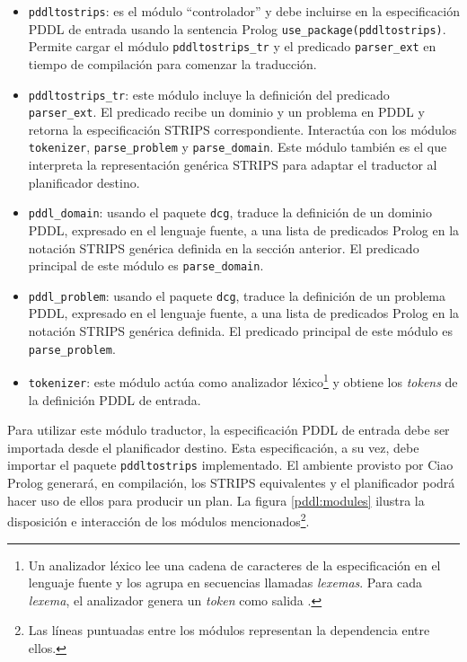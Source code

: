 	\begin{itemize}
	
	\item \texttt{pddltostrips}: es el m\'odulo
	``controlador'' y debe incluirse en la especificaci\'on PDDL de entrada
	usando la sentencia Prolog
        \texttt{use\_package(pddltostrips)}. Permite cargar el 
        m\'odulo \texttt{pddltostrips\_tr} y el
	predicado \texttt{parser\_ext} en tiempo de compilaci\'on
        para comenzar la traducci\'on.
	
	
	\item \texttt{pddltostrips\_tr}: este m\'odulo incluye la
        definici\'on del predicado \texttt{parser\_ext}. 
        El pre\-di\-ca\-do recibe un dominio y un problema en PDDL y retorna
        la especificaci\'on STRIPS correspondiente. Interact\'ua con
        los m\'odulos \texttt{tokenizer}, \texttt{parse\_problem}
        y \texttt{parse\_domain}. 
        Este m\'odulo tambi\'en es el que interpreta la
        representaci\'on gen\'erica STRIPS para adaptar el traductor
        al planificador destino.
	
	\item \texttt{pddl\_domain}: usando el paquete \texttt{dcg}, traduce la definici\'on de un
        dominio PDDL, expresado en el lenguaje fuente, a una lista de predicados 
	Prolog en la notaci\'on STRIPS gen\'erica definida en la
        secci\'on anterior. El predicado principal de este m\'odulo es \texttt{parse\_domain}.
	
	\item \texttt{pddl\_problem}: usando el paquete \texttt{dcg}, traduce la definici\'on de un
	problema PDDL, expresado en el lenguaje fuente, a una lista de predicados
	Prolog en la notaci\'on STRIPS gen\'erica definida. El
	predicado principal de este m\'odulo es \texttt{parse\_problem}.
	
	\item \texttt{tokenizer}: este m\'odulo act\'ua como
	analizador l\'exico\footnote{Un analizador l\'exico lee una
	cadena de caracteres de la especificaci\'on en el lenguaje
	fuente y los agrupa en secuencias
	llamadas \emph{lexemas}. Para cada \emph{lexema}, el
	analizador genera un \emph{token} como salida \cite{gbraun:Aho:2007}.} y 
        obtiene los \emph{tokens} de la definici\'on PDDL de entrada.
	
	\end{itemize}
	
	Para utilizar este m\'odulo traductor, la especificaci\'on
	PDDL de entrada debe ser importada desde el planificador destino. 
	Esta especificaci\'on, a su vez, debe importar el
	paquete \texttt{pddltostrips} implementado.
        El am\-bien\-te provisto por Ciao Prolog generar\'a, en compilaci\'on, los
	STRIPS equivalentes y el planificador
	podr\'a hacer uso de ellos para producir un plan.
	La figura \ref{pddl:modules} ilustra la disposici\'on e
        interacci\'on de los m\'odulos mencionados\footnote{Las
        l\'ineas puntuadas entre los m\'odulos representan la
        dependencia entre ellos.}.  
	
